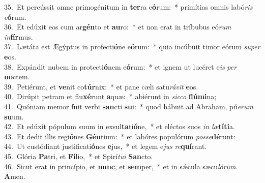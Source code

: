 {35.~}Et percússit omne primogénitum in \textbf{ter}ra e\textbf{ó}rum:~* primítias omnis labó\textit{ris} \textit{e}\textbf{ó}rum.\\
{36.~}Et edúxit eos cum ar\textbf{gén}to et \textbf{au}ro:~* et non erat in tríbubus eó\textit{rum} \textit{in}\textbf{fír}mus.\\
{37.~}Lætáta est Ægýptus in profecti\textbf{ó}ne e\textbf{ó}rum:~* quia incúbuit timor eórum \textit{su}\textit{per} \textbf{e}os.\\
{38.~}Expándit nubem in protecti\textbf{ó}nem e\textbf{ó}rum:~* et ignem ut lucéret e\textit{is} \textit{per} \textbf{no}ctem.\\
{39.~}Petiérunt, et \textbf{ve}nit co\textbf{túr}nix:~* et pane cæli satu\textit{rá}\textit{vit} \textbf{e}os.\\
{40.~}Dirúpit petram et flu\textbf{xé}runt \textbf{a}quæ:~* abiérunt in \textit{sic}\textit{co} \textbf{flú}\textbf{mi}na;\\
{41.~}Quóniam memor fuit verbi \textbf{san}cti \textbf{su}i:~* quod hábuit ad Abraham, pú\textit{e}\textit{rum} \textbf{su}um.\\
{42.~}Et edúxit pópulum suum in exsul\textbf{ta}ti\textbf{ó}ne,~* et eléctos suos \textit{in} \textit{læ}\textbf{tí}\textbf{ti}a.\\
{43.~}Et dedit illis regi\textbf{ó}nes \textbf{Gén}tium:~* et labóres populórum \textit{pos}\textit{se}\textbf{dé}runt:\\
{44.~}Ut custódiant justificati\textbf{ó}nes \textbf{e}jus,~* et legem e\textit{jus} \textit{re}\textbf{quí}rant.\\
{45.~}Glória \textbf{Pa}tri, et \textbf{Fí}lio,~* et Spirí\textit{tu}\textit{i} \textbf{San}cto.\\
{46.~}Sicut erat in princípio, et \textbf{nunc}, et \textbf{sem}per,~* et in sǽcula sæcu\textit{ló}\textit{rum}. \textbf{A}men.\\
